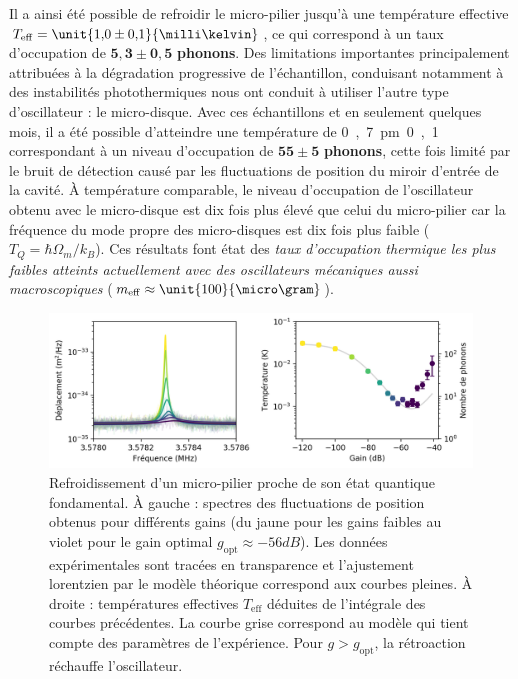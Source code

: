 \documentclass[12pt,a4paper]{article}
\begin{document}
Il a ainsi été possible de refroidir le micro-pilier jusqu'à une température effective $T_\mathrm{eff} = \unit{1{,}0\pm 0{,}1}{\milli\kelvin}$, ce qui correspond à un taux d'occupation de $\mathbf{5{,}3 \pm 0{,}5}$ \textbf{phonons}.
Des limitations importantes principalement attribuées à la dégradation progressive de l'échantillon, conduisant notamment à des instabilités photothermiques nous ont conduit à utiliser l'autre type d'oscillateur : le micro-disque.
Avec ces échantillons et en seulement quelques mois, il a été possible d'atteindre une température de \unit{0{,}7\pm 0{,}1}{\milli\kelvin} correspondant à un niveau d'occupation de $\mathbf{55\pm5}$ \textbf{phonons}, cette fois limité par le bruit de détection causé par les fluctuations de position du miroir d'entrée de la cavité.
À température comparable, le niveau d'occupation de l'oscillateur obtenu avec le micro-disque est dix fois plus élevé que celui du micro-pilier car la fréquence du mode propre des micro-disques est dix fois plus faible ($T_Q = \hbar\Omega_m/k_B$).
Ces résultats font état des \textit{taux d'occupation thermique les plus faibles atteints actuellement avec des oscillateurs mécaniques aussi macroscopiques} ($m_\mathrm{eff}\approx\unit{100}{\micro\gram}$). 

\begin{figure}
\center
\includegraphics[scale=0.75]{figures/feedback_cooling_6phonons.png}
\caption{Refroidissement d'un micro-pilier proche de son état quantique fondamental.
À gauche : spectres des fluctuations de position obtenus pour différents gains (du jaune pour les gains faibles au violet pour le gain optimal $g_\mathrm{opt}\approx\unit{-56}{dB}$).
Les données expérimentales sont tracées en transparence et l'ajustement lorentzien par le modèle théorique correspond aux courbes pleines.
À droite : températures effectives $T_\mathrm{eff}$ déduites de l'intégrale des courbes précédentes.
La courbe grise correspond au modèle qui tient compte des paramètres de l'expérience.
Pour $g>g_\mathrm{opt}$, la rétroaction réchauffe l'oscillateur.}
\label{fig:feedback_cooling_pillar}
\end{figure}
\end{document}

